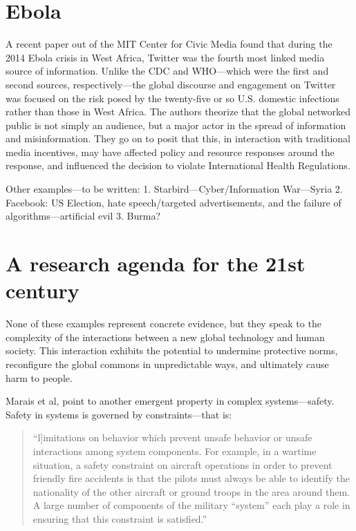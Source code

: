 \documentclass[10pt,twocolumn]{article}   	%
\begin{document}
\section{Ebola}\label{ebola}

A recent paper out of the MIT Center for Civic Media found that during
the 2014 Ebola crisis in West Africa, Twitter was the fourth most linked
media source of information. Unlike the CDC and WHO---which were the
first and second sources, respectively---the global discourse and
engagement on Twitter was focused on the risk posed by the twenty-five
or so U.S. domestic infections rather than those in West Africa. The
authors theorize that the global networked public is not simply an
audience, but a major actor in the spread of information and
misinformation. They go on to posit that this, in interaction with
traditional media incentives, may have affected policy and resource
responses around the response, and influenced the decision to violate
International Health Regulations.\cite[p. 51-52]{Roberts2017}

Other examples---to be written: 1. Starbird---Cyber/Information
War---Syria 2. Facebook: US Election, hate speech/targeted
advertisements, and the failure of algorithms---artificial evil 3.
Burma?

\section{A research agenda for the 21st
century}\label{a-research-agenda-for-the-21st-century}

None of these examples represent concrete evidence, but they speak to
the complexity of the interactions between a new global technology and
human society. This interaction exhibits the potential to undermine
protective norms, reconfigure the global commons in unpredictable ways,
and ultimately cause harm to people.

Marais et al, point to another emergent property in complex
systems---safety. Safety in systems is governed by constraints---that
is:

\begin{quote}
``\cite{}l{]}imitations on behavior which prevent unsafe behavior or unsafe
interactions among system components. For example, in a wartime
situation, a safety constraint on aircraft operations in order to
prevent friendly fire accidents is that the pilots must always be able
to identify the nationality of the other aircraft or ground troops in
the area around them. A large number of components of the military
``system'' each play a role in ensuring that this constraint is
satisfied.''\cite[p.13-14]{Marais}
\end{quote}
\end{document}
